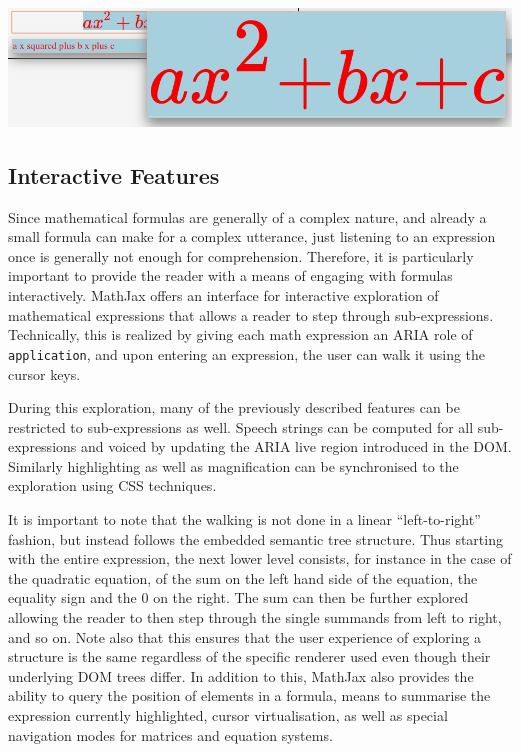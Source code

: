\documentclass{sig-alternate}
\begin{document}
\begin{center}
  \includegraphics[width=.7\linewidth]{magnification}  
\end{center}


\subsection{Interactive Features}

Since mathematical formulas are generally of a complex nature, and already a
small formula can make for a complex utterance, just listening to an expression
once is generally not enough for comprehension. Therefore, it is particularly
important to provide the reader with a means of engaging with formulas
interactively. MathJax offers an interface for interactive exploration of
mathematical expressions that allows a reader to step through sub-expressions.
Technically, this is realized by giving each math expression an ARIA role of
\texttt{application}, and upon entering an expression, the user can walk it
using the cursor keys.

During this exploration, many of the previously described features can be
restricted to sub-expressions as well. Speech strings can be
computed for all sub-expressions and voiced by updating the ARIA live region
introduced in the DOM. Similarly highlighting as well as magnification can be
synchronised to the exploration using CSS techniques.

It is important to note that the walking is not done in a linear
``left-to-right'' fashion, but instead follows the embedded semantic tree
structure. Thus starting with the entire expression, the next lower level
consists, for instance in the case of the quadratic equation, of the sum on the
left hand side of the equation, the equality sign and the $0$ on the right.  The
sum can then be further explored allowing the reader to then step through the
single summands from left to right, and so on.  Note also that this
ensures that the user experience of exploring a structure is the same regardless
of the specific renderer used even though their underlying DOM trees differ.
In addition to this, MathJax also provides the ability to
query the position of elements in a formula, means to summarise the expression currently
highlighted, cursor virtualisation, as well as special navigation modes for
matrices and equation systems.
\end{document}
